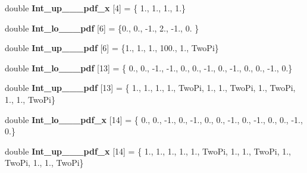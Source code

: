 \begin{DoxyCompactItemize}
\item 
\hypertarget{namespaceIntLimits_a405d520ea75f6e1869cf105361a32a1e}{double {\bfseries Int\-\_\-up\-\_\-\_\-\_\-pdf\-\_\-x} \mbox{[}4\mbox{]} = \{ 1., 1., 1., 1.\}}\label{namespaceIntLimits_a405d520ea75f6e1869cf105361a32a1e}

\item 
\hypertarget{namespaceIntLimits_ad43ecb88ae590bc86f805609065415dc}{double {\bfseries Int\-\_\-lo\-\_\-\_\-\_\-pdf} \mbox{[}6\mbox{]} = \{0., 0., -\/1., 2., -\/1., 0. \}}\label{namespaceIntLimits_ad43ecb88ae590bc86f805609065415dc}

\item 
\hypertarget{namespaceIntLimits_a2d3fd9f962096bdb83ddde6e339b11a3}{double {\bfseries Int\-\_\-up\-\_\-\_\-\_\-pdf} \mbox{[}6\mbox{]} = \{1., 1., 1., 100., 1., Two\-Pi\}}\label{namespaceIntLimits_a2d3fd9f962096bdb83ddde6e339b11a3}

\item 
\hypertarget{namespaceIntLimits_abd60cdb336bae950d56afad4f67a7f7c}{double {\bfseries Int\-\_\-lo\-\_\-\_\-\_\-pdf} \mbox{[}13\mbox{]} = \{ 0., 0., -\/1., -\/1., 0., 0., -\/1., 0., -\/1., 0., 0., -\/1., 0.\}}\label{namespaceIntLimits_abd60cdb336bae950d56afad4f67a7f7c}

\item 
\hypertarget{namespaceIntLimits_a55d13c6b15f51997943c22861e72f028}{double {\bfseries Int\-\_\-up\-\_\-\_\-\_\-pdf} \mbox{[}13\mbox{]} = \{ 1., 1., 1., 1., Two\-Pi, 1., 1., Two\-Pi, 1., Two\-Pi, 1., 1., Two\-Pi\}}\label{namespaceIntLimits_a55d13c6b15f51997943c22861e72f028}

\item 
\hypertarget{namespaceIntLimits_a0bd33a34c3322bc5beb22dcff8ff5fea}{double {\bfseries Int\-\_\-lo\-\_\-\_\-\_\-pdf\-\_\-x} \mbox{[}14\mbox{]} = \{ 0., 0., -\/1., 0., -\/1., 0., 0., -\/1., 0., -\/1., 0., 0., -\/1., 0.\}}\label{namespaceIntLimits_a0bd33a34c3322bc5beb22dcff8ff5fea}

\item 
\hypertarget{namespaceIntLimits_a3d36c9fbb051e0f30cbdfc7b36894bb2}{double {\bfseries Int\-\_\-up\-\_\-\_\-\_\-pdf\-\_\-x} \mbox{[}14\mbox{]} = \{ 1., 1., 1., 1., 1., Two\-Pi, 1., 1., Two\-Pi, 1., Two\-Pi, 1., 1., Two\-Pi\}}\label{namespaceIntLimits_a3d36c9fbb051e0f30cbdfc7b36894bb2}


\end{DoxyCompactItemize}
